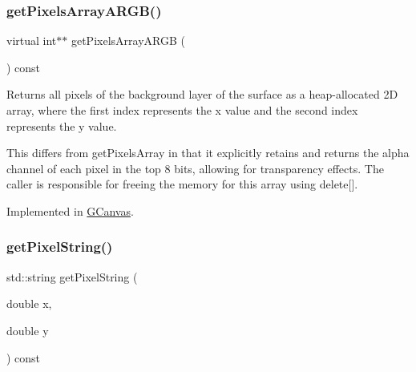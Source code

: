 \mbox{\label{classsgl_1_1GDrawingSurface_a5bd493d4580fad7e9ebd97871c959276}} 
\subsubsection{\texorpdfstring{get\+Pixels\+Array\+A\+R\+G\+B()}{getPixelsArrayARGB()}}
{\footnotesize\ttfamily virtual int$\ast$$\ast$ get\+Pixels\+Array\+A\+R\+GB (\begin{DoxyParamCaption}{ }\end{DoxyParamCaption}) const\hspace{0.3cm}{\ttfamily [pure virtual]}}



Returns all pixels of the background layer of the surface as a heap-\/allocated 2D array, where the first index represents the x value and the second index represents the y value. 

This differs from get\+Pixels\+Array in that it explicitly retains and returns the alpha channel of each pixel in the top 8 bits, allowing for transparency effects. The caller is responsible for freeing the memory for this array using delete\mbox{[}\mbox{]}. 

Implemented in \mbox{\hyperlink{classsgl_1_1GCanvas_a32164dac42ec2253f2c92a27ad98af74}{G\+Canvas}}.

\mbox{\label{classsgl_1_1GDrawingSurface_a8da04ef488ec5fa498fbbffaf50928fd}} 
\subsubsection{\texorpdfstring{get\+Pixel\+String()}{getPixelString()}}
{\footnotesize\ttfamily std\+::string get\+Pixel\+String (\begin{DoxyParamCaption}\item[{double}]{x,  }\item[{double}]{y }\end{DoxyParamCaption}) const\hspace{0.3cm}{\ttfamily [virtual]}}



